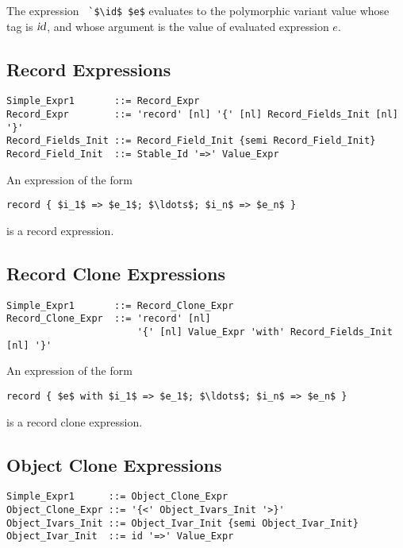 The expression ~\lstinline!`$\id$ $e$! evaluates to the polymorphic variant value whose tag is $\mbox{\sl id}$, and whose argument is the value of evaluated expression $e$. 





\subsection{Record Expressions}
\label{sec:record-expressions}

\syntax\begin{lstlisting}
Simple_Expr1       ::= Record_Expr
Record_Expr        ::= 'record' [nl] '{' [nl] Record_Fields_Init [nl] '}'
Record_Fields_Init ::= Record_Field_Init {semi Record_Field_Init}
Record_Field_Init  ::= Stable_Id '=>' Value_Expr
\end{lstlisting}

An expression of the form
\begin{lstlisting}
record { $i_1$ => $e_1$; $\ldots$; $i_n$ => $e_n$ }
\end{lstlisting}
is a record expression. 






\subsection{Record Clone Expressions}
\label{sec:record-clone-expressions}

\syntax\begin{lstlisting}
Simple_Expr1       ::= Record_Clone_Expr
Record_Clone_Expr  ::= 'record' [nl] 
                       '{' [nl] Value_Expr 'with' Record_Fields_Init [nl] '}'
\end{lstlisting}

An expression of the form
\begin{lstlisting}
record { $e$ with $i_1$ => $e_1$; $\ldots$; $i_n$ => $e_n$ }
\end{lstlisting}
is a record clone expression. 





\subsection{Object Clone Expressions}
\label{sec:object-clone-expressions}

\syntax\begin{lstlisting}
Simple_Expr1      ::= Object_Clone_Expr
Object_Clone_Expr ::= '{<' Object_Ivars_Init '>}'
Object_Ivars_Init ::= Object_Ivar_Init {semi Object_Ivar_Init}
Object_Ivar_Init  ::= id '=>' Value_Expr
\end{lstlisting}

